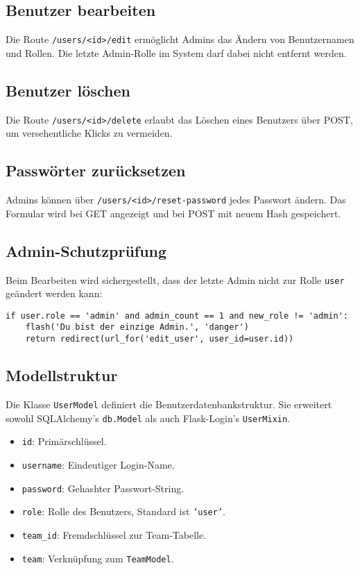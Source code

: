 \documentclass[12pt]{article}
\begin{document}
\subsection*{Benutzer bearbeiten}

Die Route \texttt{/users/<id>/edit} ermöglicht Admins das Ändern von Benutzernamen und Rollen. Die letzte Admin-Rolle im System darf dabei nicht entfernt werden.

\subsection*{Benutzer löschen}

Die Route \texttt{/users/<id>/delete} erlaubt das Löschen eines Benutzers über POST, um versehentliche Klicks zu vermeiden.

\subsection*{Passwörter zurücksetzen}

Admins können über \texttt{/users/<id>/reset-password} jedes Passwort ändern. Das Formular wird bei GET angezeigt und bei POST mit neuem Hash gespeichert.

\subsection*{Admin-Schutzprüfung}

Beim Bearbeiten wird sichergestellt, dass der letzte Admin nicht zur Rolle \texttt{user} geändert werden kann:

\begin{verbatim}
if user.role == 'admin' and admin_count == 1 and new_role != 'admin':
    flash('Du bist der einzige Admin.', 'danger')
    return redirect(url_for('edit_user', user_id=user.id))
\end{verbatim}
\newpage
\subsection{Modellstruktur}

Die Klasse \texttt{UserModel} definiert die Benutzerdatenbankstruktur. Sie erweitert sowohl SQLAlchemy's \texttt{db.Model} als auch Flask-Login’s \texttt{UserMixin}.

\begin{itemize}
  \item \texttt{id}: Primärschlüssel.
  \item \texttt{username}: Eindeutiger Login-Name.
  \item \texttt{password}: Gehashter Passwort-String.
  \item \texttt{role}: Rolle des Benutzers, Standard ist \texttt{'user'}.
  \item \texttt{team\_id}: Fremdschlüssel zur Team-Tabelle.
  \item \texttt{team}: Verknüpfung zum \texttt{TeamModel}.
\end{itemize}
\end{document}

